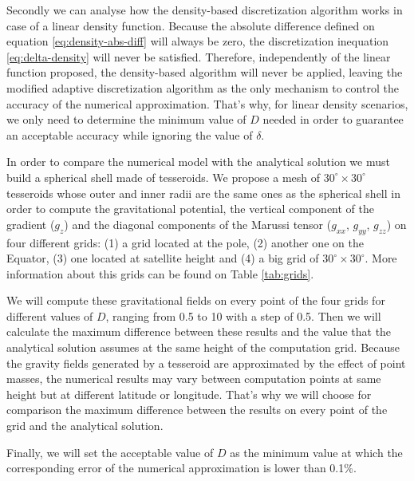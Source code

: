 \documentclass[extra]{gji}
\begin{document}
Secondly we can analyse how the density-based discretization algorithm
works in case of a linear density function.
Because the absolute difference defined on equation
\ref{eq:density-abs-diff} will always be zero, the discretization
inequation \ref{eq:delta-density} will never be satisfied.
Therefore, independently of the linear function proposed, the
density-based algorithm will never be applied, leaving the modified
adaptive discretization algorithm as the only mechanism to control the
accuracy of the numerical approximation.
That's why, for linear density scenarios, we only need to determine
the minimum value of $D$ needed in order to guarantee an acceptable
accuracy while ignoring the value of $\delta$.

In order to compare the numerical model with the analytical solution we
must build a spherical shell made of tesseroids.
We propose a mesh of $30^\circ \times 30^\circ$ tesseroids whose outer and
inner radii are the same ones as the spherical shell in order to compute
the gravitational potential, the vertical component of the gradient
($g_z$) and the diagonal components of the Marussi tensor ($g_{xx}$,
$g_{yy}$, $g_{zz}$) on four different grids: (1) a grid located at the
pole, (2) another one on the Equator, (3) one located at satellite
height and (4) a big grid of $30^\circ \times 30^\circ$.
More information about this grids can be found on Table
\ref{tab:grids}.

We will compute these gravitational fields on every point of the four
grids for different values of $D$, ranging from 0.5 to 10 with a step
of 0.5.
Then we will calculate the maximum difference between these results and the
value that the analytical solution assumes at the same height of the
computation grid.
Because the gravity fields generated by a tesseroid are approximated by
the effect of point masses, the numerical results may vary between
computation points at same height but at different latitude or
longitude.
That's why we will choose for comparison the maximum difference between the
results on every point of the grid and the analytical solution.

Finally, we will set the acceptable value of $D$ as the minimum value
at which the corresponding error of the numerical approximation is
lower than 0.1\%.
\end{document}
